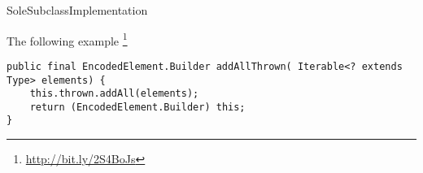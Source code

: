 \begin{pattern}{SoleSubclassImplementation}

\instances{}
The following example%
\footnote{\url{http://bit.ly/2S4BoJs}}

\begin{verbatim}
public final EncodedElement.Builder addAllThrown( Iterable<? extends Type> elements) {
    this.thrown.addAll(elements);
    return (EncodedElement.Builder) this;
}
\end{verbatim}

\detection{}

\discussion{}

\related{}

\end{pattern}